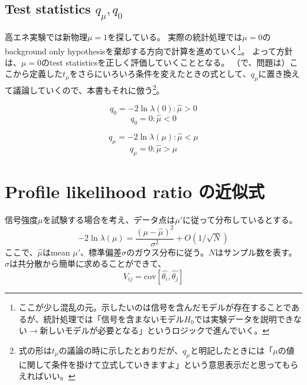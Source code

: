 \subsection{Test statistics $q_\mu,q_0$}
高エネ実験では新物理$\mu=1$を探している。
実際の統計処理では$\mu=0$のbackground only hypothesisを棄却する方向で計算を進めていく\footnote{ここが少し混乱の元。示したいのは信号を含んだモデルが存在することであるが、統計処理では「信号を含まないモデル$H_0$では実験データを説明できない$\to$新しいモデルが必要となる」というロジックで進んでいく。}。
よって方針は、$\mu=0$のtest statisticsを正しく評価していくこととなる。
（で、問題は）ここから定義した$t_\mu$をさらにいろいろ条件を変えたときの式として、$q_\mu$に置き換えて議論していくので、本書もそれに倣う\footnote{
式の形は$t_\mu$の議論の時に示したとおりだが、$q_\mu$と明記したときには「$\mu$の値に関して条件を掛けて立式していきますよ」という意思表示だと思ってもらえればいい。}。

\begin{equation}
  q_0 = -2\ln\lambda(0) : \hat{\mu} > 0
\end{equation}
\begin{equation}
  q_0 = 0 : \hat{\mu} < 0
\end{equation}

\begin{equation}
  q_\mu = -2\ln\lambda(\mu) : \hat{\mu} < \mu
\end{equation}
\begin{equation}
  q_\mu = 0 : \hat{\mu} > \mu
\end{equation}

\section{Profile likelihood ratio の近似式}
信号強度$\mu$を試験する場合を考え、データ点は$\mu'$に従って分布しているとする。
\begin{equation}
-2\ln\lambda(\mu) = \frac{(\mu-\hat{\mu})^2}{\sigma^2} + O(1/\sqrt{N})
\end{equation}
ここで、$\hat{\mu}$はmean $\mu'$、標準偏差$\sigma$のガウス分布に従う。$N$はサンプル数を表す。
$\sigma$は共分散から簡単に求めることができて、
\begin{equation}
  V_{ij} = \mathrm{cov}[\hat{\theta_i}, \hat{\theta_j}]
\end{equation}

